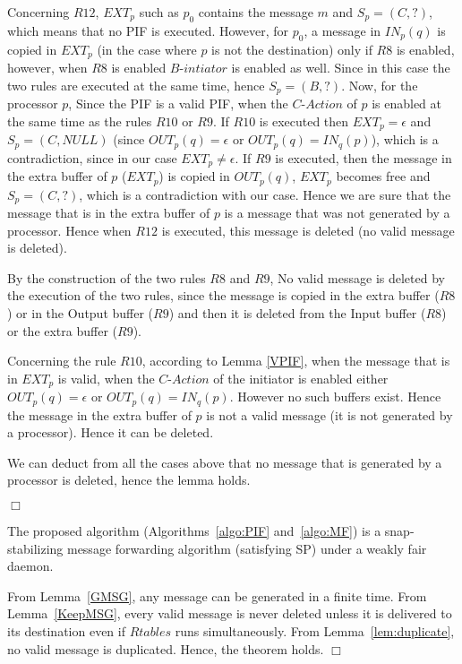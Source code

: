 \documentclass{llncs}
\renewenvironment{proof}{{\it Proof. } }{{\hfill $\Box$}\vspace{.5pc}}
\begin{document}
\begin{proof}
Concerning $R12$, $EXT_{p}$ such as $p_0$ contains the message $m$ and $S_{p}=(C,?)$, which means that no PIF is executed. However, for $p_0$, a message in $IN_{p}(q)$ is copied in $EXT_{p}$  (in the case where $p$ is not the destination) only if $R8$ is enabled, however, when $R8$ is enabled $B\mbox{-}intiator$ is enabled as well. Since in this case the two rules are executed at the same time, hence $S_{p}=(B,?)$. Now, for the processor $p$, Since the PIF is a valid PIF, when the $C\mbox{-}Action$ of $p$ is enabled at the same time as the rules $R10$ or $R9$. If $R10$ is executed then $EXT_{p}=\epsilon$ and $S_{p}=(C,NULL)$ (since $OUT_{p}(q)=\epsilon$ or $OUT_{p}(q)=IN_{q}(p)$), which is a contradiction, since in our case $EXT_{p}\ne \epsilon$. If $R9$ is executed, then the message in the extra buffer of $p$ ($EXT_{p}$) is copied in $OUT_{p}(q)$, $EXT_{p}$ becomes free and $S_{p}=(C,?)$, which is a contradiction with our case. Hence we are sure that the message that is in the extra buffer of $p$ is a message that was not generated by a processor. Hence when $R12$ is executed, this message is deleted (no valid message is deleted).

By the construction of the two rules $R8$ and $R9$, No valid message is deleted by the execution of the two rules, since the message is copied in the extra buffer ($R8$) or in the Output buffer ($R9$) and then it is deleted from the Input buffer ($R8$) or the extra buffer ($R9$).

Concerning the rule $R10$, according to Lemma \ref{VPIF}, when the message that is in $EXT_{p}$ is valid, when the $C\mbox{-}Action$ of the initiator is enabled either $OUT_{p}(q)=\epsilon$ or $OUT_{p}(q)=IN_{q}(p)$. However no such buffers exist. Hence the message in the extra buffer of $p$ is not a valid message (it is not generated by a processor). Hence it can be deleted.

We can deduct from all the cases above that no message that is generated by a processor is deleted, hence the lemma holds.  

\end{proof}



\begin{theorem}
The proposed algorithm (Algorithms~\ref{algo:PIF} and~\ref{algo:MF}) is a snap-stabilizing message forwarding
algorithm (satisfying SP) under a weakly fair daemon. 
\end{theorem}

\begin{proof}
From Lemma~\ref{GMSG}, any message can be generated in a finite time.  
From Lemma~\ref{KeepMSG}, every valid message is never deleted unless it is delivered to its destination even if $Rtables$ runs simultaneously.
From Lemma~\ref{lem:duplicate}, no valid message is duplicated. 
Hence, the theorem holds.
\end{proof}
\end{document}
